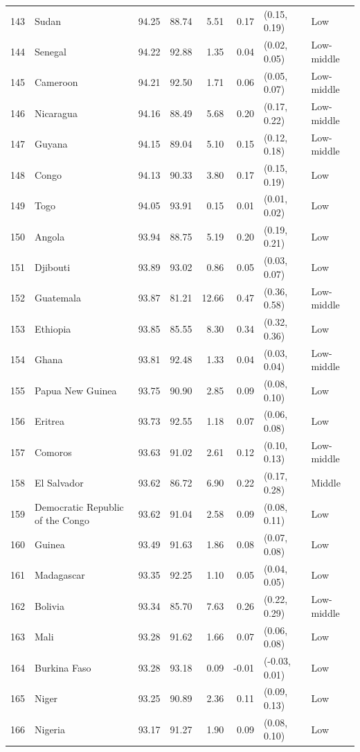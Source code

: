 \begin{longtable}{r l r r r r l l}
143 & Sudan & 94.25 & 88.74 & 5.51 & 0.17 & (0.15, 0.19) & Low \\
144 & Senegal & 94.22 & 92.88 & 1.35 & 0.04 & (0.02, 0.05) & Low-middle \\
145 & Cameroon & 94.21 & 92.50 & 1.71 & 0.06 & (0.05, 0.07) & Low-middle \\
146 & Nicaragua & 94.16 & 88.49 & 5.68 & 0.20 & (0.17, 0.22) & Low-middle \\
147 & Guyana & 94.15 & 89.04 & 5.10 & 0.15 & (0.12, 0.18) & Low-middle \\
148 & Congo & 94.13 & 90.33 & 3.80 & 0.17 & (0.15, 0.19) & Low \\
149 & Togo & 94.05 & 93.91 & 0.15 & 0.01 & (0.01, 0.02) & Low \\
150 & Angola & 93.94 & 88.75 & 5.19 & 0.20 & (0.19, 0.21) & Low \\
151 & Djibouti & 93.89 & 93.02 & 0.86 & 0.05 & (0.03, 0.07) & Low \\
152 & Guatemala & 93.87 & 81.21 & 12.66 & 0.47 & (0.36, 0.58) & Low-middle \\
153 & Ethiopia & 93.85 & 85.55 & 8.30 & 0.34 & (0.32, 0.36) & Low \\
154 & Ghana & 93.81 & 92.48 & 1.33 & 0.04 & (0.03, 0.04) & Low-middle \\
155 & Papua New Guinea & 93.75 & 90.90 & 2.85 & 0.09 & (0.08, 0.10) & Low \\
156 & Eritrea & 93.73 & 92.55 & 1.18 & 0.07 & (0.06, 0.08) & Low \\
157 & Comoros & 93.63 & 91.02 & 2.61 & 0.12 & (0.10, 0.13) & Low-middle \\
158 & El Salvador & 93.62 & 86.72 & 6.90 & 0.22 & (0.17, 0.28) & Middle \\
159 & Democratic Republic of the Congo & 93.62 & 91.04 & 2.58 & 0.09 & (0.08, 0.11) & Low \\
160 & Guinea & 93.49 & 91.63 & 1.86 & 0.08 & (0.07, 0.08) & Low \\
161 & Madagascar & 93.35 & 92.25 & 1.10 & 0.05 & (0.04, 0.05) & Low \\
162 & Bolivia & 93.34 & 85.70 & 7.63 & 0.26 & (0.22, 0.29) & Low-middle \\
163 & Mali & 93.28 & 91.62 & 1.66 & 0.07 & (0.06, 0.08) & Low \\
164 & Burkina Faso & 93.28 & 93.18 & 0.09 & -0.01 & (-0.03, 0.01) & Low \\
165 & Niger & 93.25 & 90.89 & 2.36 & 0.11 & (0.09, 0.13) & Low \\
166 & Nigeria & 93.17 & 91.27 & 1.90 & 0.09 & (0.08, 0.10) & Low \\

\end{longtable}
